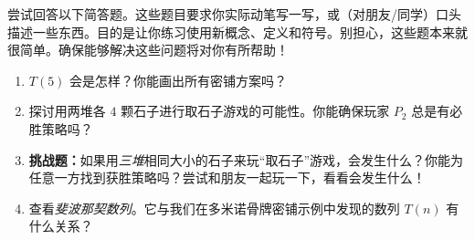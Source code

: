 尝试回答以下简答题。这些题目要求你实际动笔写一写，或（对朋友/同学）口头描述一些东西。目的是让你练习使用新概念、定义和符号。别担心，这些题本来就很简单。确保能够解决这些问题将对你有所帮助！

\begin{enumerate}[label=(\arabic*)]
    \item $T(5)$ 会是怎样？你能画出所有密铺方案吗？
    \item 探讨用两堆各 $4$ 颗石子进行取石子游戏的可能性。你能确保玩家 $P_2$ 总是有必胜策略吗？
    \item \textbf{挑战题：}如果用\textit{三堆}相同大小的石子来玩``取石子''游戏，会发生什么？你能为任意一方找到获胜策略吗？尝试和朋友一起玩一下，看看会发生什么！
    \item 查看\textit{斐波那契数列}。它与我们在多米诺骨牌密铺示例中发现的数列 $T(n)$ 有什么关系？
\end{enumerate}